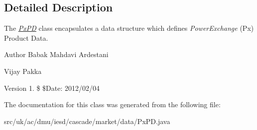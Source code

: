 \subsection{Detailed Description}
The {\itshape \hyperlink{classuk_1_1ac_1_1dmu_1_1iesd_1_1cascade_1_1market_1_1data_1_1_px_p_d}{Px\-P\-D}} class encapsulates a data structure which defines {\itshape Power\-Exchange} (Px) Product Data. 

\begin{DoxyAuthor}{Author}
Babak Mahdavi Ardestani 

Vijay Pakka 
\end{DoxyAuthor}
\begin{DoxyVersion}{Version}
1. \$ \$\-Date\-: 2012/02/04 
\end{DoxyVersion}


The documentation for this class was generated from the following file\-:\begin{DoxyCompactItemize}
\item 
src/uk/ac/dmu/iesd/cascade/market/data/Px\-P\-D.\-java\end{DoxyCompactItemize}
